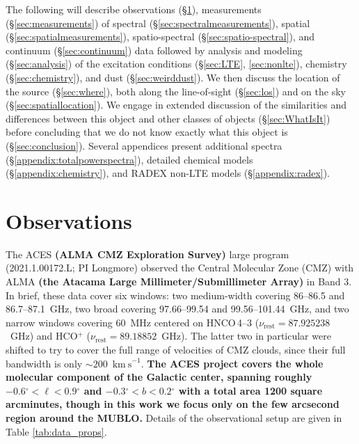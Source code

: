 \documentclass[]{aastex631}
\newcommand{\kms}{\ensuremath{\mathrm{km~s}^{-1}}\xspace}
\renewcommand{\deg}{\ensuremath{^{\circ}}\xspace}
\def\rr#1{\textbf{#1}}
\begin{document}
The following will describe observations (\S \ref{sec:observations}), measurements (\S \ref{sec:measurements}) of spectral (\S \ref{sec:spectralmeasurements}), spatial (\S \ref{sec:spatialmeasurements}), spatio-spectral (\S \ref{sec:spatio-spectral}), and continuum (\S \ref{sec:continuum}) data followed by analysis and modeling (\S \ref{sec:analysis}) of the excitation conditions (\S \ref{sec:LTE}, \ref{sec:nonlte}), chemistry (\S \ref{sec:chemistry}), and dust (\S \ref{sec:weirddust}).
We then discuss the location of the source (\S \ref{sec:where}), both along the line-of-sight (\S \ref{sec:los}) and on the sky (\S \ref{sec:spatiallocation}).
We engage in extended discussion of the similarities and differences between this object and other classes of objects (\S \ref{sec:WhatIsIt}) before concluding that we do not know exactly what this object is (\S \ref{sec:conclusion}).
Several appendices present additional spectra (\S \ref{appendix:totalpowerspectra}), detailed chemical models (\S \ref{appendix:chemistry}), and RADEX non-LTE models (\S \ref{appendix:radex}).


\section{Observations}
\label{sec:observations}
The ACES \rr{(ALMA CMZ Exploration Survey)} large program (2021.1.00172.L; PI Longmore) observed the Central Molecular Zone (CMZ) with ALMA \rr{(the Atacama Large Millimeter/Submillimeter Array)} in Band 3.
In brief, these data cover six windows: two medium-width covering 86--86.5 and 86.7--87.1~GHz, two broad covering 97.66--99.54 and 99.56--101.44~GHz, and two narrow windows covering 60~MHz centered on HNCO\,4--3 ($\nu_\mathrm{rest}=87.925238$~GHz) and HCO$^{+}$ ($\nu_\mathrm{rest}=89.18852$~GHz).
The latter two in particular were shifted to try to cover the full range of velocities of CMZ clouds, since their full bandwidth is only $\sim200$~\kms.
\rr{The ACES project covers the whole molecular component of the Galactic center, spanning roughly $-0.6\deg<\ell<0.9\deg$ and $-0.3\deg<b<0.2\deg$ with a total area 1200 square arcminutes, though in this work we focus only on the few arcsecond region around the MUBLO.}
Details of the observational setup are given in Table \ref{tab:data_props}.
\end{document}
